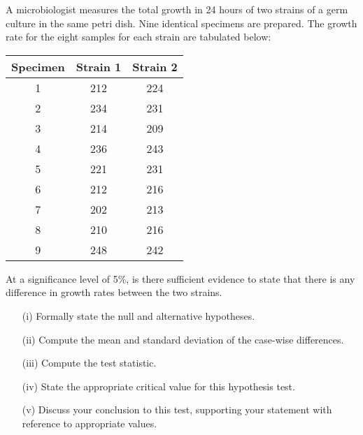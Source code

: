 \item A microbiologist measures the total growth in 24 hours of two strains of a germ culture  in the same petri dish. Nine identical specimens are prepared. The growth rate for the eight samples for each strain are tabulated below:

\begin{center}
	\begin{tabular}{|c|c|c|} \hline 
		Specimen &	Strain 1	&	Strain 2	\\ \hline \hline
		1 & 212 & 224 \\ \hline
		2 & 234 & 231 \\ \hline
		3 & 214 & 209 \\ \hline
		4 & 236 & 243 \\ \hline
		5 & 221 & 231 \\ \hline 
		6 & 212 & 216 \\ \hline
		7 & 202 & 213 \\ \hline 
		8 & 210 & 216 \\ \hline
		9 & 248 & 242 \\ \hline
	\end{tabular} 
\end{center}
\noindent At a significance level of 5\%, is there sufficient evidence to state that there is any difference in growth rates between the two strains.




\begin{itemize}
	\item[(i)] Formally state the null and alternative hypotheses.
	\item[(ii)]  Compute the mean and standard deviation of the case-wise differences.
	\item[(iii)] Compute the test statistic.
	\item[(iv)] State the appropriate critical value for this hypothesis test.
	\item[(v)] Discuss your conclusion to this test, supporting your statement with reference to appropriate values.
\end{itemize}



